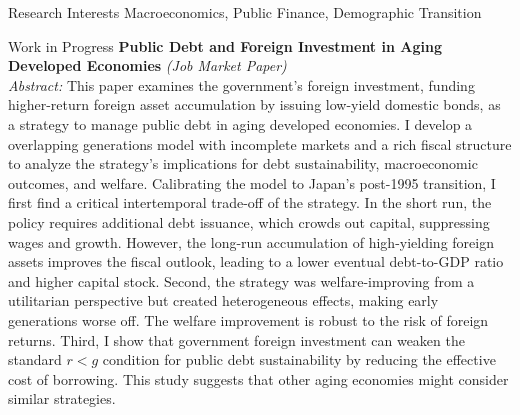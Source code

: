 \documentclass{cv} %
\begin{document}
\begin{rSection}{Research Interests}
Macroeconomics, Public Finance, Demographic Transition
\end{rSection}
\bigskip
\begin{rSection}{Work in Progress}
\medskip
{\bf Public Debt and Foreign Investment in Aging Developed Economies} \emph{(Job Market Paper)} \\
\begin{adjustbox}{minipage=0.95\textwidth, right}
	\vspace{0.3em} {\emph{Abstract:} This paper examines the government's foreign investment, funding higher-return foreign asset accumulation by issuing low-yield domestic bonds, as a strategy to manage public debt in aging developed economies. I develop a overlapping generations model with incomplete markets and a rich fiscal structure to analyze the strategy's implications for debt sustainability, macroeconomic outcomes, and welfare. Calibrating the model to Japan's post-1995 transition, I first find a critical intertemporal trade-off of the strategy. In the short run, the policy requires additional debt issuance, which crowds out capital, suppressing wages and growth. However, the long-run accumulation of high-yielding foreign assets improves the fiscal outlook, leading to a lower eventual debt-to-GDP ratio and higher capital stock. Second, the strategy was welfare-improving from a utilitarian perspective but created heterogeneous effects, making early generations worse off. The welfare improvement is robust to the risk of foreign returns. Third, I show that government foreign investment can weaken the standard $r<g$ condition for public debt sustainability by reducing the effective cost of borrowing. This study suggests that other aging economies might consider similar strategies.}
\end{adjustbox}


\end{rSection}
\end{document}
